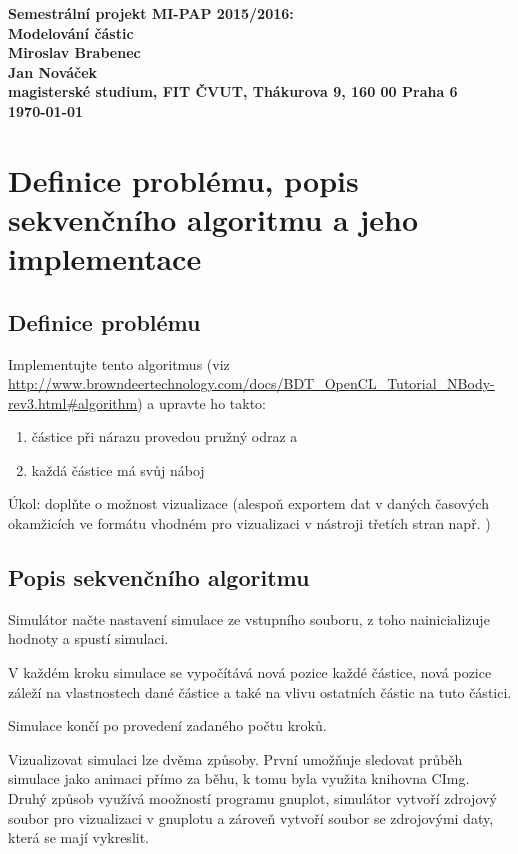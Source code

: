 \documentclass[12pt]{article}
\begin{document}
\begin{center}
\bf Semestrální projekt MI-PAP 2015/2016:\\[5mm]
    Modelování částic\\[5mm]
       Miroslav Brabenec\\
       Jan Nováček\\[2mm]
magisterské studium, FIT ČVUT, Thákurova 9, 160 00 Praha 6\\[2mm]
\today
\end{center}
%
%
%
%
%
\section{Definice problému, popis sekvenčního algoritmu a jeho implementace}

\subsection{Definice problému}
Implementujte tento algoritmus (viz \url{http://www.browndeertechnology.com/docs/BDT_OpenCL_Tutorial_NBody-rev3.html#algorithm}) a upravte ho takto:

\begin{enumerate}
\item	částice při nárazu provedou pružný odraz a
\item	každá částice má svůj náboj
\end{enumerate}

Úkol: doplňte o možnost vizualizace (alespoň exportem dat v daných časových okamžicích ve formátu vhodném pro vizualizaci v nástroji třetích stran např. ) 

\subsection{Popis sekvenčního algoritmu}
Simulátor načte nastavení simulace ze vstupního souboru, z toho nainicializuje hodnoty a spustí simulaci.

V každém kroku simulace se vypočítává nová pozice každé částice, nová pozice záleží na vlastnostech dané částice a také na vlivu ostatních částic na tuto částici.

Simulace končí po provedení zadaného počtu kroků.

Vizualizovat simulaci lze dvěma způsoby.
První umožňuje sledovat průběh simulace jako animaci přímo za běhu, k tomu byla využita knihovna CImg.
Druhý způsob využívá moožností programu gnuplot,
simulátor vytvoří zdrojový soubor pro vizualizaci v gnuplotu a zároveň vytvoří soubor se zdrojovými daty, která se mají vykreslit.
\end{document}
